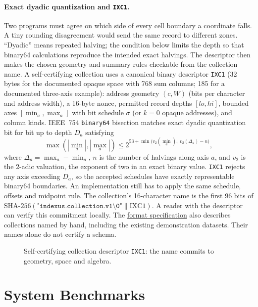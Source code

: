 \documentclass[11pt]{article}
\begin{document}
\paragraph{Exact dyadic quantization and \texttt{IXC1}.}
Two programs must agree on which side of every cell boundary a coordinate falls. A tiny rounding disagreement would send the same record to different zones. ``Dyadic'' means repeated halving; the condition below limits the depth so that binary64 calculations reproduce the intended exact halvings. The descriptor then makes the chosen geometry and summary rules checkable from the collection name.
A self-certifying collection uses a canonical binary descriptor \texttt{IXC1} (32 bytes for the documented opaque space with 768 sum columns; 185 for a documented three-axis example): address geometry $(c, W)$ (bits per character and address width), a 16-byte nonce, permitted record depths $[lo, hi]$, bounded axes $[\min_a, \max_a]$ with bit schedule $\sigma$ (or $k=0$ opaque addresses), and column kinds. IEEE~754 \texttt{binary64} bisection matches exact dyadic quantization bit for bit up to depth $D_a$ satisfying
\[
\max(|\min_a|, |\max_a|) \le 2^{53 + \min\bigl(v_2(\min_a),\; v_2(\Delta_a) - n\bigr)},
\]
where $\Delta_a = \max_a - \min_a$, $n$ is the number of halvings along axis $a$, and $v_2$ is the 2-adic valuation, the exponent of two in an exact binary value. \texttt{IXC1} rejects any axis exceeding $D_a$, so the accepted schedules have exactly representable binary64 boundaries. An implementation still has to apply the same schedule, offsets and midpoint rule. The collection's 16-character name is the first 96 bits of $\mathrm{SHA\text{-}256}(\texttt{"indexus.collection.v1\textbackslash 0"} \parallel \mathrm{IXC1})$. A reader with the descriptor can verify this commitment locally. The \href{https://github.com/indexus/core/blob/5188b61/docs/protocol/collection-description.md}{format specification} also describes collections named by hand, including the existing demonstration datasets. Their names alone do not certify a schema.

\begin{figure}[H]
    \centering
    \caption{Self-certifying collection descriptor \texttt{IXC1}: the name commits to geometry, space and algebra.}
\end{figure}

\section{System Benchmarks}\hypertarget{ix:benchmarks}{}
\end{document}
